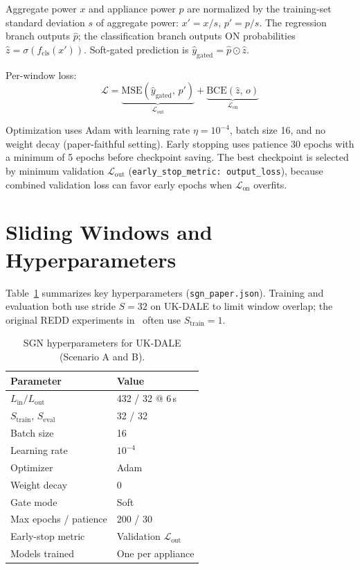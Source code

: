 \documentclass[conference]{IEEEtran}
\begin{document}
Aggregate power $x$ and appliance power $p$ are normalized by the training-set standard deviation $s$ of aggregate power: $x' = x/s$, $p' = p/s$.
The regression branch outputs $\hat{p}$; the classification branch outputs ON probabilities $\hat{z} = \sigma(f_{\mathrm{cls}}(x'))$.
Soft-gated prediction is $\hat{y}_{\mathrm{gated}} = \hat{p} \odot \hat{z}$.

Per-window loss:
\begin{equation}
\mathcal{L} = \underbrace{\mathrm{MSE}(\hat{y}_{\mathrm{gated}},\, p')}_{\mathcal{L}_{\mathrm{out}}}
+ \underbrace{\mathrm{BCE}(\hat{z},\, o)}_{\mathcal{L}_{\mathrm{on}}}
\label{eq:loss}
\end{equation}

Optimization uses Adam with learning rate $\eta = 10^{-4}$, batch size 16, and no weight decay (paper-faithful setting).
Early stopping uses patience 30 epochs with a minimum of 5 epochs before checkpoint saving.
The best checkpoint is selected by minimum validation $\mathcal{L}_{\mathrm{out}}$ (\texttt{early\_stop\_metric: output\_loss}), because combined validation loss can favor early epochs when $\mathcal{L}_{\mathrm{on}}$ overfits.

\section{Sliding Windows and Hyperparameters}
Table~\ref{tab:hparams} summarizes key hyperparameters (\texttt{sgn\_paper.json}).
Training and evaluation both use stride $S = 32$ on UK-DALE to limit window overlap; the original REDD experiments in~\cite{shin2019sgn} often use $S_{\mathrm{train}} = 1$.

\begin{table}[htbp]
\caption{SGN hyperparameters for UK-DALE (Scenario A and B).}
\label{tab:hparams}
\centering
\small
\begin{tabular}{@{}ll@{}}
\toprule
\textbf{Parameter} & \textbf{Value} \\
\midrule
$L_{\mathrm{in}} / L_{\mathrm{out}}$ & 432 / 32 @ 6\,s \\
$S_{\mathrm{train}}$, $S_{\mathrm{eval}}$ & 32 / 32 \\
Batch size & 16 \\
Learning rate & $10^{-4}$ \\
Optimizer & Adam \\
Weight decay & 0 \\
Gate mode & Soft \\
Max epochs / patience & 200 / 30 \\
Early-stop metric & Validation $\mathcal{L}_{\mathrm{out}}$ \\
Models trained & One per appliance \\
\bottomrule
\end{tabular}
\end{table}
\end{document}

